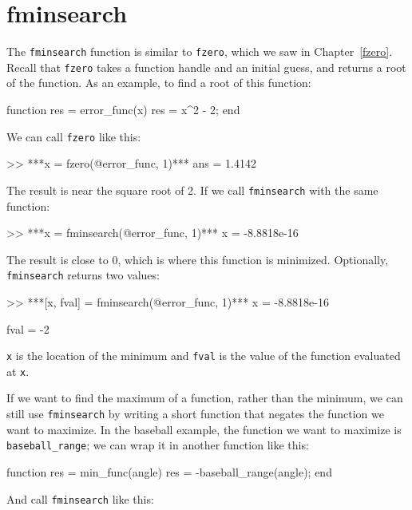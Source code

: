 \section{fminsearch}

The \lstinline{fminsearch} function is similar to \lstinline{fzero}, which we saw in Chapter~\ref{fzero}.  Recall that \lstinline{fzero} takes a function handle and an initial guess, and returns a root of the function.
As an example, to find a root of this function:


\begin{code}
function res = error_func(x)
    res = x^2 - 2;
end
\end{code}
We can call \lstinline{fzero} like this:

\begin{code}
>> ***x = fzero(@error_func, 1)***
ans = 1.4142
\end{code}

The result is near the square root of 2.  If we call \lstinline{fminsearch} with the same function:

\begin{code}
>> ***x = fminsearch(@error_func, 1)***
x = -8.8818e-16
\end{code}

The result is close to 0, which is where this function is minimized.  Optionally, \lstinline{fminsearch} returns two values:

\begin{code}
>> ***[x, fval] = fminsearch(@error_func, 1)***
x = -8.8818e-16

fval = -2
\end{code}

\lstinline{x} is the location of the minimum and \lstinline{fval} is the value of the function evaluated at \lstinline{x}.

If we want to find the maximum of a function, rather than the minimum, we can still use \lstinline{fminsearch} by writing a short function that negates the function we want to maximize.
In the baseball example, the function we want to maximize is \lstinline{baseball_range}; we can wrap it in another function like this:

\begin{code}
function res = min_func(angle)
    res = -baseball_range(angle);
end
\end{code}
And call \lstinline{fminsearch} like this:

